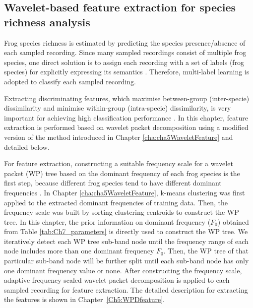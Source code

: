 \subsection{Wavelet-based feature extraction for species richness analysis}
Frog species richness is estimated by predicting the species presence/absence of each sampled recording. Since many sampled recordings consist of multiple frog species, one direct solution is to assign each recording with a set of labels (frog species) for explicitly expressing its semantics \citep{ZhangReview2014}. Therefore, multi-label learning is adopted to classify each sampled recording. 

Extracting discriminating features, which maximise between-group (inter-specie) dissimilarity
and minimise within-group (intra-specie) dissimilarity, is very important for achieving high classification performance \citep{huang2009frog, bedoya2014automatic}. In this chapter, feature extraction is performed based on wavelet packet decomposition using a modified version of the method introduced in Chapter \ref{cha:cha5WaveletFeature} and detailed below. 

For feature extraction, constructing a suitable frequency scale for a wavelet packet (WP) tree based on the dominant frequency of each frog species is the first step, because different frog species tend to have different dominant frequencies \citep{Gingras2013}. In Chapter \ref{cha:cha5WaveletFeature}, k-means clustering was first applied to the extracted dominant frequencies of training data. Then, the frequency scale was built by sorting clustering centroids to construct the WP tree. In this chapter, the prior information on dominant frequency  ($F_{0}$) obtained from Table \ref{tab:Ch7_parameters} is directly used to construct the WP tree. We iteratively detect each WP tree sub-band node until the frequency range of each node includes more than one dominant frequency $F_{0}$. Then, the WP tree of that particular sub-band node will be further split until each sub-band node has only one dominant frequency value or none. After constructing the frequency scale, adaptive frequency scaled wavelet packet decomposition is applied to each sampled recording for feature extraction. The detailed description for extracting the features is shown in Chapter~\ref{Ch5:WPDfeature}.


